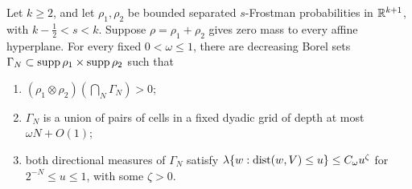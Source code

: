 \begin{lemma}\label{prep:coarse-filter}
Let $k\ge2$, and let $\rho_1,\rho_2$ be bounded separated
$s$-Frostman probabilities in $\mathbb R^{k+1}$, with
$k-\tfrac12<s<k$. Suppose $\rho=\rho_1+\rho_2$ gives zero mass
to every affine hyperplane. For every fixed $0<\omega\le1$, there
are decreasing Borel sets $\Gamma_N\subset\operatorname{supp}\rho_1\times\operatorname{supp}\rho_2$
such that
\begin{enumerate}
\item $(\rho_1\otimes\rho_2)(\bigcap_N\Gamma_N)>0$;
\item $\Gamma_N$ is a union of pairs of cells in a fixed dyadic
grid of depth at most $\omega N+O(1)$;
\item both directional measures of $\Gamma_N$ satisfy
$\lambda\{w:\operatorname{dist}(w,V)\le u\}\le C_\omega u^\zeta$
for $2^{-N}\le u\le1$, with some $\zeta>0$.
\end{enumerate}
\end{lemma}
